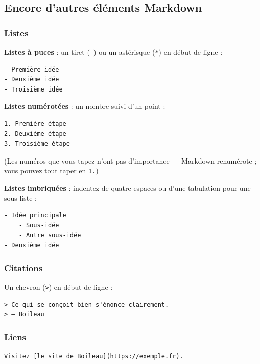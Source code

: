 \documentclass[11pt,a4paper]{article}
\theoremstyle{definition}
\begin{document}
\subsection{Encore d'autres éléments Markdown}

\subsubsection{Listes}

\textbf{Listes à puces} : un tiret (\texttt{-}) ou un astérisque (\texttt{*}) en début de
ligne :


\begin{lstlisting}
- Première idée
- Deuxième idée
- Troisième idée
\end{lstlisting}


\textbf{Listes numérotées} : un nombre suivi d'un point :


\begin{lstlisting}
1. Première étape
2. Deuxième étape
3. Troisième étape
\end{lstlisting}


(Les numéros que vous tapez n'ont pas d'importance — Markdown
renumérote ; vous pouvez tout taper en \texttt{1.})


\textbf{Listes imbriquées} : indentez de quatre espaces ou d'une
tabulation pour une sous-liste :


\begin{lstlisting}
- Idée principale
    - Sous-idée
    - Autre sous-idée
- Deuxième idée
\end{lstlisting}


\subsubsection{Citations}

Un chevron (\texttt{>}) en début de ligne :


\begin{lstlisting}
> Ce qui se conçoit bien s'énonce clairement.
> — Boileau
\end{lstlisting}


\subsubsection{Liens}

\begin{lstlisting}
Visitez [le site de Boileau](https://exemple.fr).
\end{lstlisting}
\end{document}
